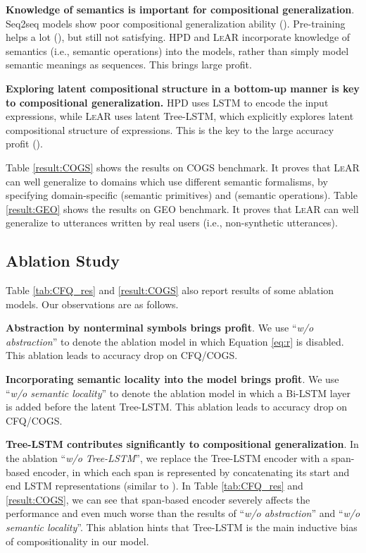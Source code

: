 \documentclass[11pt,a4paper]{article}
\begin{document}
\noindent \textbf{Knowledge of semantics is important for compositional generalization}.
Seq2seq models show poor compositional generalization ability ().
Pre-training helps a lot (), but still not satisfying.
\textsc{HPD} and \textsc{LeAR} incorporate knowledge of semantics (i.e., semantic operations) into the models, rather than simply model semantic meanings as sequences.
This brings large profit.

\noindent \textbf{Exploring latent compositional structure in a bottom-up manner is key to compositional generalization.}
\textsc{HPD} uses LSTM to encode the input expressions, while \textsc{LeAR} uses latent Tree-LSTM, which explicitly explores latent compositional structure of expressions.
This is the key to the large accuracy profit ().

Table \ref{result:COGS} shows the results on COGS benchmark.
It proves that \textsc{LeAR} can well generalize to domains which use different semantic formalisms, by specifying domain-specific  (semantic primitives) and  (semantic operations).
Table \ref{result:GEO} shows the results on GEO benchmark.
It proves that \textsc{LeAR} can well generalize to utterances written by real users (i.e., non-synthetic utterances).


\subsection{Ablation Study}
\label{section:ablation}

Table \ref{tab:CFQ_res} and \ref{result:COGS} also report results of some ablation models.
Our observations are as follows.

\noindent \textbf{Abstraction by nonterminal symbols brings profit}.
We use ``\textit{w/o abstraction}'' to denote the ablation model in which Equation \ref{eq:r} is disabled.
This ablation leads to  accuracy drop on CFQ/COGS.

\noindent \textbf{Incorporating semantic locality into the model brings profit}.
We use ``\textit{w/o semantic locality}'' to denote the ablation model in which a Bi-LSTM layer is added before the latent Tree-LSTM.
This ablation leads to  accuracy drop on CFQ/COGS.

\noindent \textbf{Tree-LSTM contributes significantly to compositional generalization}. 
In the ablation ``\emph{w/o Tree-LSTM}'', we replace the Tree-LSTM encoder with a span-based encoder, in which each span is represented by concatenating its start and end LSTM representations (similar to \citet{herzig2020span-csp}).
In Table \ref{tab:CFQ_res} and \ref{result:COGS}, we can see that span-based encoder severely affects the performance and even much worse than the results of ``\textit{w/o abstraction}'' and ``\textit{w/o semantic locality}''.
This ablation hints that Tree-LSTM is the main inductive bias of compositionality in our model.
\end{document}
